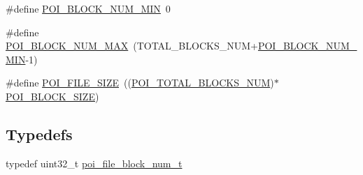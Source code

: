 \begin{DoxyCompactItemize}
\item 
\#define \hyperlink{file-manager_8h_ab2fc50553048b34a8582e052c6aa916f}{P\-O\-I\-\_\-\-B\-L\-O\-C\-K\-\_\-\-N\-U\-M\-\_\-\-M\-I\-N}~0
\item 
\#define \hyperlink{file-manager_8h_a361dba6c3d2ccf0d9ec032bca995ac0f}{P\-O\-I\-\_\-\-B\-L\-O\-C\-K\-\_\-\-N\-U\-M\-\_\-\-M\-A\-X}~(T\-O\-T\-A\-L\-\_\-\-B\-L\-O\-C\-K\-S\-\_\-\-N\-U\-M+\hyperlink{file-manager_8h_ab2fc50553048b34a8582e052c6aa916f}{P\-O\-I\-\_\-\-B\-L\-O\-C\-K\-\_\-\-N\-U\-M\-\_\-\-M\-I\-N}-\/1)
\item 
\#define \hyperlink{file-manager_8h_a658dce617c9d4f4d337c99b2efac8dfb}{P\-O\-I\-\_\-\-F\-I\-L\-E\-\_\-\-S\-I\-Z\-E}~((\hyperlink{file-manager_8h_aab5f281daf18993acf5f25ae7fecef0d}{P\-O\-I\-\_\-\-T\-O\-T\-A\-L\-\_\-\-B\-L\-O\-C\-K\-S\-\_\-\-N\-U\-M})$\ast$\hyperlink{file-manager_8h_afb59af7070cf0cd010913eef940ffbbd}{P\-O\-I\-\_\-\-B\-L\-O\-C\-K\-\_\-\-S\-I\-Z\-E})
\end{DoxyCompactItemize}
\subsection*{Typedefs}
\begin{DoxyCompactItemize}
\item 
typedef uint32\-\_\-t \hyperlink{file-manager_8h_aef709af8fc6566dcaf55b656bb9f8881}{poi\-\_\-file\-\_\-block\-\_\-num\-\_\-t}
\end{DoxyCompactItemize}
